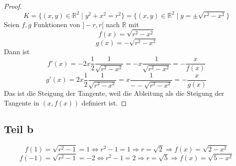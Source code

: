 \documentclass[10pt,a4paper]{article}
\begin{document}
\begin{proof}
\begin{equation}
K = \{ (x, y) \in \mathbb{R}^{2} \mid y^{2} + x^{2} = r^{2} \} = \{ (x, y) \in \mathbb{R}^{2} \mid y = \pm \sqrt{r^{2} - x^{2}} \}
\end{equation}
Seien $f, g$ Funktionen von $]-r, r[$ nach $\mathbb{R}$ mit
\begin{equation}
f(x) = \sqrt{r^{2} - x^{2}}
\end{equation}
\begin{equation}
g(x) = -\sqrt{r^{2} - x^{2}}
\end{equation}
Dann ist
\begin{equation}
f'(x) = -2x \frac{1}{2} \frac{1}{\sqrt{r^{2} - x^{2}}} = -x\frac{1}{\sqrt{r^{2} - x^{2}}} = -\frac{x}{f(x)}
\end{equation}
\begin{equation}
g'(x) = 2x \frac{1}{2} \frac{1}{\sqrt{r^{2} - x^{2}}} = x\frac{1}{--\sqrt{r^{2} - x^{2}}} = -\frac{x}{g(x)}
\end{equation}
Das ist die Steigung der Tangente, weil die Ableitung als die Steigung der Tangente in $(x, f(x))$ definiert ist.
\end{proof}

\subsection*{Teil b}

\begin{equation}
f(1) = \sqrt{r^{2} - 1} = 1 \Leftrightarrow r^{2} - 1 = 1 \Rightarrow r = \sqrt{2} \Rightarrow f(x) = \sqrt{2 - x^{2}}
\end{equation}
\begin{equation}
f(-1) = \sqrt{r^{2} - 1} = -2 \Leftrightarrow r^{2} - 1 = 2 \Rightarrow r = \sqrt{5} \Rightarrow f(x) = \sqrt{5 - x^{2}}
\end{equation}
\end{document}

